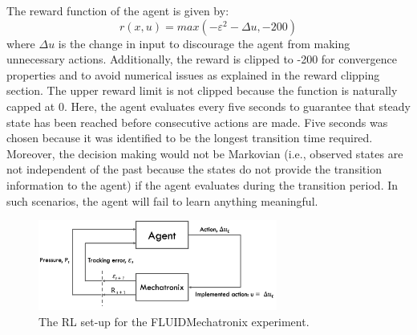 The reward function of the agent is given by:
\begin{equation}
    r(x, u) = max(-\varepsilon^2 - \Delta u, -200)
\end{equation}
where $\Delta u$ is the change in input to discourage the agent from making unnecessary actions. Additionally, the reward is clipped to -200 for convergence properties and to avoid numerical issues as explained in the reward clipping section. The upper reward limit is not clipped because the function is naturally capped at 0. Here, the agent evaluates every five seconds to guarantee that steady state has been reached before consecutive actions are made. Five seconds was chosen because it was identified to be the longest transition time required. Moreover, the decision making would not be Markovian (i.e., observed states are not independent of the past because the states do not provide the transition information to the agent) if the agent evaluates during the transition period. In such scenarios, the agent will fail to learn anything meaningful. 

\begin{figure}[H]
    \centering
    \includegraphics[width=0.7\textwidth]{images/ch4/rl_system1}
    \caption{The RL set-up for the FLUIDMechatronix experiment.}
    \label{fig:04rl_system1}
\end{figure}

